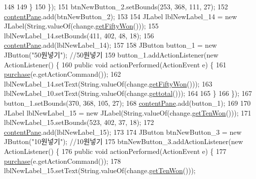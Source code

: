 \begin{DoxyCode}
148 
149             \}
150         \});
151         btnNewButton\_2.setBounds(253, 368, 111, 27);
152         \hyperlink{class_vending_machine_1_1_machine_u_i_ac8ef25585e46da798d067af0eefa1a03}{contentPane}.add(btnNewButton\_2);
153         
154         JLabel lblNewLabel\_14 = \textcolor{keyword}{new} JLabel(String.valueOf(change.\hyperlink{class_vending_machine_1_1_change_a1ef85014ae005316e4a39db49e8364a7}{getFiftyWon}()));
155         lblNewLabel\_14.setBounds(411, 402, 48, 18);
156         \hyperlink{class_vending_machine_1_1_machine_u_i_ac8ef25585e46da798d067af0eefa1a03}{contentPane}.add(lblNewLabel\_14);
157         
158         JButton button\_1 = \textcolor{keyword}{new} JButton(\textcolor{stringliteral}{"50원넣기"}); \textcolor{comment}{//50원넣기}
159         button\_1.addActionListener(\textcolor{keyword}{new} ActionListener() \{
160             \textcolor{keyword}{public} \textcolor{keywordtype}{void} actionPerformed(ActionEvent e) \{
161                 \hyperlink{class_vending_machine_1_1_machine_u_i_aadccf593dc69281c9ebbfe1fbe09b804}{purchase}(e.getActionCommand());
162                 lblNewLabel\_14.setText(String.valueOf(change.\hyperlink{class_vending_machine_1_1_change_a1ef85014ae005316e4a39db49e8364a7}{getFiftyWon}()));
163                 lblNewLabel\_10.setText(String.valueOf(change.\hyperlink{class_vending_machine_1_1_change_a07a32d7240178343fa1273d075d73c64}{gettotal}()));
164 
165             \}
166         \});
167         button\_1.setBounds(370, 368, 105, 27);
168         \hyperlink{class_vending_machine_1_1_machine_u_i_ac8ef25585e46da798d067af0eefa1a03}{contentPane}.add(button\_1);
169         
170         JLabel lblNewLabel\_15 = \textcolor{keyword}{new} JLabel(String.valueOf(change.\hyperlink{class_vending_machine_1_1_change_ac6b95aa923e6727f5ecf8095b7f42e99}{getTenWon}()));
171         lblNewLabel\_15.setBounds(523, 402, 37, 18);
172         \hyperlink{class_vending_machine_1_1_machine_u_i_ac8ef25585e46da798d067af0eefa1a03}{contentPane}.add(lblNewLabel\_15);     
173 
174         JButton btnNewButton\_3 = \textcolor{keyword}{new} JButton(\textcolor{stringliteral}{"10원넣기"}); \textcolor{comment}{//10원넣기}
175         btnNewButton\_3.addActionListener(\textcolor{keyword}{new} ActionListener() \{
176             \textcolor{keyword}{public} \textcolor{keywordtype}{void} actionPerformed(ActionEvent e) \{
177                 \hyperlink{class_vending_machine_1_1_machine_u_i_aadccf593dc69281c9ebbfe1fbe09b804}{purchase}(e.getActionCommand());
178                 lblNewLabel\_15.setText(String.valueOf(change.\hyperlink{class_vending_machine_1_1_change_ac6b95aa923e6727f5ecf8095b7f42e99}{getTenWon}()));

\end{DoxyCode}
